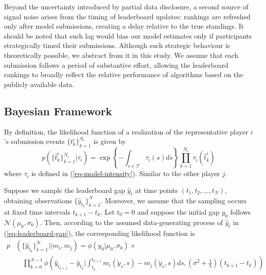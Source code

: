 \documentclass[mnsc]{informs3}
\begin{document}
Beyond the uncertainty introduced by partial data disclosure, a second source of signal noise arises from the timing of leaderboard updates: 
rankings are refreshed only after model submissions, creating a delay relative to the true standings.
It should be noted that such lag would bias our model estimates only if participants strategically timed their submissions.
Although such strategic behaviour is theoretically possible, we abstract from it in this study.
We assume that each submission follows a period of substantive effort, allowing the leaderboard rankings to broadly reflect the relative performance of algorithms based on the publicly available data.




\subsection{Bayesian Framework}

By definition, the likelihood function of a realization of the representative player $i$'s submission events $\{t^i_k\}_{k=1}^{N_i}$ is given by 
\begin{equation}\label{eq-ihpp-prob}
p\left(\{\hat{t}^i_k\}_{k=1}^{N_i} | \tau_i\right) = \exp\left\{-\int_{s\in\mathcal{T}}\tau_i(s)ds\right\}\prod_{k=1}^{N_i}\tau_i(\hat{t}^i_k)
\end{equation}
where $\tau_i$ is defined in (\ref{eq-model-intensity}). 
Similar to the other player $j$. 

Suppose we sample the leaderboard gap $\hat{y}_t$ at time points $(t_1, t_2, ..., t_N)$, obtaining observations $\{\hat{y}_{t_k}\}^N_{k=1}$. 
Moreover, we assume that the sampling occurs at fixed time intervals $t_{k+1}-t_k$. 
Let $t_0 = 0$ and suppose the initial gap $y_0$ follows $\mathcal{N}(\mu_0, \sigma_0)$. 
Then, according to the assumed data-generating process of $\hat{y}_t$ in (\ref{eq-leaderboard-gap}), the corresponding likelihood function is
\begin{equation}
\begin{aligned}
p&\left(\{\hat{y}_{t_k}\}_{k=1}^N)| m_i, m_j\right) = 
\phi\left(y_0 | \mu_0, \sigma_0\right) \times\\
&\quad\prod_{k=0}^{N-1}\phi\left(\hat{y}_{t_{k+1}}-\hat{y}_{t_k}|\int_{t_k}^{t_{k+1}}m_i(\tilde{y}_s, s) - m_j(\tilde{y}_s, s)ds, \left(\sigma^2+\frac{1}{\lambda}\right)(t_{k+1}-t_k)\right)
\end{aligned}
\end{equation}
\end{document}
